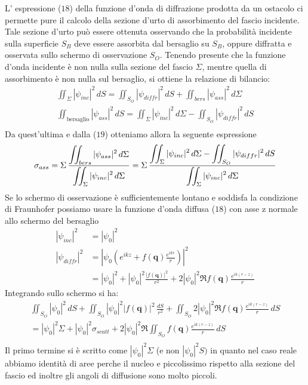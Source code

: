 L' espressione ($18$) della funzione d'onda di diffrazione prodotta da un ostacolo ci permette pure il calcolo della sezione d'urto di assorbimento del fascio incidente.
Tale sezione d'urto può essere ottenuta osservando che la probabilità incidente sulla superficie $S_B$ deve essere assorbita dal bersaglio su $S_B$, oppure diffratta e osservata sullo schermo di osservazione $S_O$.
Tenendo presente che la funzione d'onda incidente è non nulla sulla sezione del fascio $\Sigma$, mentre quella di assorbimento è non nulla sul bersaglio, si ottiene la relazione di bilancio:
\begin{gather*}
	\iint_{\Sigma} |\psi_{inc}|^2 \, dS =
	\iint_{S_O} |\psi_{diffr}|^2 \, dS +
	\iint_{bers} |\psi_{ass}|^2 \, d \Sigma\\
	\iint_{\text{bersaglio}} |\psi_{ass}|^2 \, dS =
	\iint_{\Sigma} |\psi_{inc}|^2 \, d\Sigma -
	\iint_{S_O} |\psi_{diffr}|^2 \, dS\\
\end{gather*} Da quest'ultima e dalla ($19$) otteniamo allora la seguente espressione \[
	\sigma_{ass} =\Sigma \, \fraclarg{\iint_{bers} |\psi_{ass}|^2 \, d \Sigma}{\iint_{\Sigma} |\psi_{inc}|^2 \, d \Sigma}
	= \Sigma \, \fraclarg{\iint_{\Sigma} |\psi_{inc}|^2 \, d\Sigma -
		\iint_{S_O} |\psi_{diffr}|^2 \, dS}{\iint_{\Sigma} |\psi_{inc}|^2 \, d \Sigma}
\] Se lo schermo di osservazione è sufficientemente lontano e soddisfa la condizione di Fraunhofer possiamo usare la funzione d'onda diffusa ($18$) con asse z normale allo schermo del bersaglio \begin{align*}
	|\psi_{inc}|^2   & = |\psi_0|^2                                                                                           \\
	|\psi_{diffr}|^2 & = \left | \psi_0 \left( e^{ikz} + f(\bm{q})\frac{e^{ikr}}{r} \right) \right|^2                         \\
	                 & =  |\psi_0|^2 + |\psi_0|^2 \frac{|f(\bm{q})|^2}{r^2} + 2 |\psi_0|^2 \Re f(\bm{q})\frac{e^{ik(r-z)}}{r}
\end{align*} Integrando sullo schermo si ha: \begin{gather*}
	\iint_{S_O} |\psi_0|^2 \, dS + \iint_{S_O}|\psi_0|^2 |f(\bm{q})|^2\, \frac{dS}{r^2} + \iint_{S_O}2 |\psi_0|^2 \Re f(\bm{q})\frac{e^{ik(r-z)}}{r} \, dS\\
	= |\psi_0|^2 \Sigma + |\psi_0|^2 \sigma_{scatt} + 2 |\psi_0|^2 \Re \iint_{S_O} f(\bm{q})\frac{e^{ik(r-z)}}{r} \,dS\\
\end{gather*} Il primo termine si è scritto come $|\psi_0|^2 \Sigma$ (e non $|\psi_0|^2 S)$ in quanto nel caso reale abbiamo identità di aree perche il nucleo e piccolissimo rispetto alla sezione del fascio ed inoltre gli angoli di diffusione sono molto piccoli.

